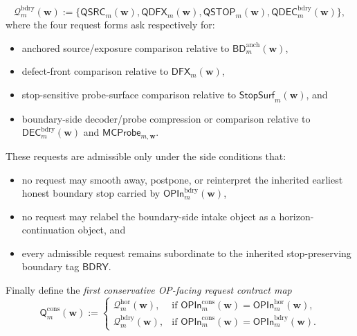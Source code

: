 \begin{definition}
\begin{enumerate}[label=(\roman*)]
 \[
 \mathcal Q^{\mathrm{bdry}}_{m}(\mathbf w)
 :=
 \{\mathsf{QSRC}_{m}(\mathbf w),\mathsf{QDFX}_{m}(\mathbf w),\mathsf{QSTOP}_{m}(\mathbf w),\mathsf{QDEC}^{\mathrm{bdry}}_{m}(\mathbf w)\},
 \]
 where the four request forms ask respectively for:
 \begin{itemize}[leftmargin=2em]
 \item anchored source/exposure comparison relative to \(\mathsf{BD}^{\mathrm{anch}}_{m}(\mathbf w)\),
 \item defect-front comparison relative to \(\mathsf{DFX}_{m}(\mathbf w)\),
 \item stop-sensitive probe-surface comparison relative to \(\mathsf{StopSurf}_{m}(\mathbf w)\), and
 \item boundary-side decoder/probe compression or comparison relative to \(\mathsf{DEC}^{\mathrm{bdry}}_{m}(\mathbf w)\) and \(\mathsf{MCProbe}_{m,\mathbf w}\).
 \end{itemize}
 These requests are admissible only under the side conditions that:
 \begin{itemize}[leftmargin=2em]
 \item no request may smooth away, postpone, or reinterpret the inherited earliest honest boundary stop carried by \(\mathsf{OPIn}^{\mathrm{bdry}}_{m}(\mathbf w)\),
 \item no request may relabel the boundary-side intake object as a horizon-continuation object, and
 \item every admissible request remains subordinate to the inherited stop-preserving boundary tag \(\mathsf{BDRY}\).
 \end{itemize}
\end{enumerate}
Finally define the \emph{first conservative OP-facing request contract map}
\[
 \mathsf{Q}^{\mathrm{cons}}_{m}(\mathbf w)
 :=
 \begin{cases}
 \mathcal Q^{\mathrm{hor}}_{m}(\mathbf w), & \text{if }\mathsf{OPIn}^{\mathrm{cons}}_{m}(\mathbf w)=\mathsf{OPIn}^{\mathrm{hor}}_{m}(\mathbf w),\\[2mm]
 \mathcal Q^{\mathrm{bdry}}_{m}(\mathbf w), & \text{if }\mathsf{OPIn}^{\mathrm{cons}}_{m}(\mathbf w)=\mathsf{OPIn}^{\mathrm{bdry}}_{m}(\mathbf w).
 \end{cases}
\]
\end{definition}

